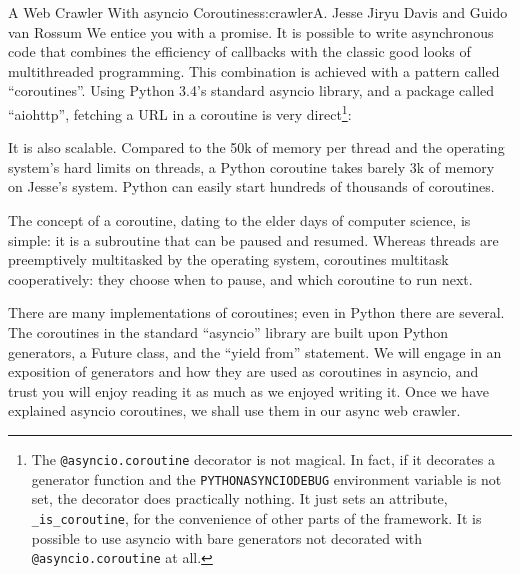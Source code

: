 \begin{aosachapter}{A Web Crawler With asyncio Coroutines}{s:crawler}{A. Jesse Jiryu Davis and Guido van Rossum}
We entice you with a promise. It is possible to write asynchronous code
that combines the efficiency of callbacks with the classic good looks of
multithreaded programming. This combination is achieved with a pattern
called ``coroutines''. Using Python 3.4's standard asyncio library, and
a package called ``aiohttp'', fetching a URL in a coroutine is very
direct\footnote{The \texttt{@asyncio.coroutine} decorator is not
  magical. In fact, if it decorates a generator function and the
  \texttt{PYTHONASYNCIODEBUG} environment variable is not set, the
  decorator does practically nothing. It just sets an attribute,
  \texttt{\_is\_coroutine}, for the convenience of other parts of the
  framework. It is possible to use asyncio with bare generators not
  decorated with \texttt{@asyncio.coroutine} at all.}:

\begin{Shaded}
\begin{Highlighting}[]
     
          
          
\end{Highlighting}
\end{Shaded}

It is also scalable. Compared to the 50k of memory per thread and the
operating system's hard limits on threads, a Python coroutine takes
barely 3k of memory on Jesse's system. Python can easily start hundreds
of thousands of coroutines.

The concept of a coroutine, dating to the elder days of computer
science, is simple: it is a subroutine that can be paused and resumed.
Whereas threads are preemptively multitasked by the operating system,
coroutines multitask cooperatively: they choose when to pause, and which
coroutine to run next.

There are many implementations of coroutines; even in Python there are
several. The coroutines in the standard ``asyncio'' library are built
upon Python generators, a Future class, and the ``yield from''
statement. We will engage in an exposition of generators and how they
are used as coroutines in asyncio, and trust you will enjoy reading it
as much as we enjoyed writing it. Once we have explained asyncio
coroutines, we shall use them in our async web crawler.

\label{how-python-generators-work}


\end{aosachapter}
